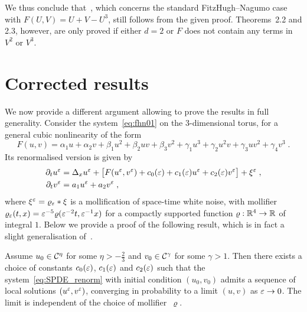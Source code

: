 \documentclass[reqno,11pt]{article}
\begin{document}
We thus conclude that~\cite[Thm.~2.1]{BK2016}, which concerns the standard
FitzHugh--Nagumo case with $F(U,V)=U+V-U^3$, still follows from the given
proof. Theorems~2.2 and 2.3, however, are only proved if either $d=2$ or $F$
does not contain any terms in $V^2$ or $V^3$.


\section{Corrected results}

We now provide a different argument allowing to prove the results in full 
generality. Consider the system~\eqref{eq:fhn01} on the $3$-dimensional torus, 
for a general cubic nonlinearity of the form
\begin{equation}
 \label{eq:FUV}
  F(u,v) = \alpha_1 u + \alpha_2 v + \beta_1 u^2 + \beta_2 uv + \beta_3 v^2
 + \gamma_1 u^3 + \gamma_2 u^2v + \gamma_3 uv^2 + \gamma_4 v^3\;.
\end{equation}
Its renormalised version is given by 
\begin{align}
\nonumber
\partial_t u^\eps &= \Delta_x u^\eps + \bigbrak{F(u^\eps,v^\eps) + c_0(\eps) + 
c_1(\eps)u^\eps + c_2(\eps)v^\eps} + \xi^\eps\;, \\
\partial_t v^\eps &= a_1 u^\eps + a_2 v^\eps\;,
\label{eq:SPDE_renorm} 
\end{align}
where $\xi^\varepsilon = \varrho_\varepsilon * \xi$ is a mollification of space-time white 
noise, with mollifier $\varrho_\varepsilon(t,x) = \varepsilon^{-5} 
\varrho(\varepsilon^{-2}t,\varepsilon^{-1}x)$ for a compactly supported function $\varrho: 
\mathbb{R}^4\to\mathbb{R}$ of integral $1$. Below we provide a proof of the following result, 
which is in fact a slight generalisation of~\cite[Thm.~2.2]{BK2016}. 

\begin{theorem}
\label{thm:main} 
Assume $u_0 \in {\mathcal C}^\eta$ for some $\eta>-\frac23$ and $v_0\in{\mathcal C}^\gamma$ for 
some $\gamma > 1$. Then there exists a choice of constants $c_0(\varepsilon)$, 
$c_1(\varepsilon)$ and $c_2(\varepsilon)$ such that the system~\eqref{eq:SPDE_renorm} 
with initial condition $(u_0,v_0)$ admits a sequence of local solutions 
$(u^\varepsilon,v^\varepsilon)$, converging in probability to a limit $(u,v)$ as $\varepsilon\to0$. 
The limit is independent of the choice of mollifier~$\varrho$.  
\end{theorem}
\end{document}
